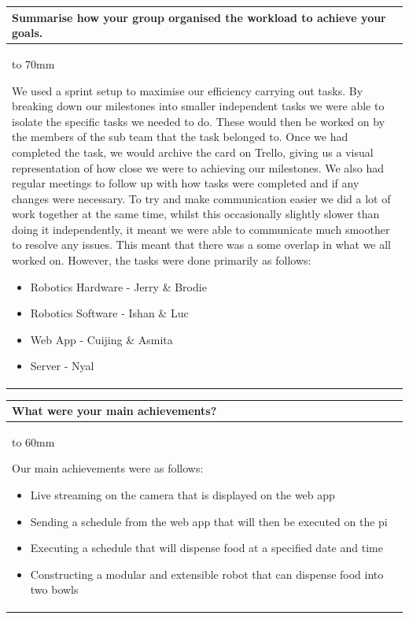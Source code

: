 \documentclass[a4paper]{article}
\newcommand{\colWidth}{141mm}
\begin{document}
\begin{center}

\begin{tabular}{|p{\colWidth}|}
	\hline
	\cellcolor{blue!25}\large
	\textbf{Summarise how your group organised the workload to achieve your goals.}
	\\ \hline
	\vtop to 70mm{
We used a sprint setup to maximise our efficiency carrying out tasks. By breaking down our milestones into smaller independent tasks we were able to isolate the specific tasks we needed to do. These would then be worked on by the members of the sub team that the task belonged to. Once we had completed the task, we would archive the card on Trello, giving us a visual representation of how close we were to achieving our milestones. We also had regular meetings to follow up with how tasks were completed and if any changes were necessary. 
To try and make communication easier we did a lot of work together at the same time, whilst this occasionally slightly slower than doing it independently, it meant we were able to communicate much smoother to resolve any issues. This meant that there was a some overlap in what we all worked on. However, the tasks were done primarily as follows:
\begin{itemize}
\item Robotics Hardware - Jerry \& Brodie
\item Robotics Software - Ishan \& Luc
\item Web App - Cuijing \& Asmita
\item Server - Nyal
\end{itemize}
  }
  \\
  \hline
\end{tabular}
\vskip 5mm


\begin{tabular}{|p{\colWidth}|}
	\hline
	\cellcolor{blue!25}\large
	\textbf{What were your main achievements?}
	\\ \hline
	\vtop to 60mm{
Our main achievements were as follows:
\begin{itemize}
\item Live streaming on the camera that is displayed on the web app
\item Sending a schedule from the web app that will then be executed on the pi
\item Executing a schedule that will dispense food at a specified date and time
\item Constructing a modular and extensible robot that can dispense food into two bowls
\end{itemize}
  }
  \\
  \hline
\end{tabular}
\vskip 5mm


\end{center}
\end{document}
